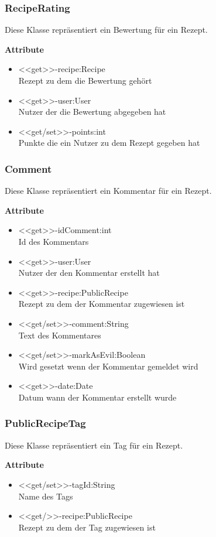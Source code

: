 \subsubsection{RecipeRating}
Diese Klasse repräsentiert ein Bewertung für ein Rezept.

\textbf{Attribute}
\begin{itemize}
	\item <<get>>-recipe:Recipe \\Rezept zu dem die Bewertung gehört
	\item <<get>>-user:User \\Nutzer der die Bewertung abgegeben hat
	\item <<get/set>>-points:int \\Punkte die ein Nutzer zu dem Rezept gegeben hat
\end{itemize}

\subsubsection{Comment}
Diese Klasse repräsentiert ein Kommentar für ein Rezept.

\textbf{Attribute}
\begin{itemize}
	\item <<get>>-idComment:int \\Id des Kommentars
	\item <<get>>-user:User \\Nutzer der den Kommentar erstellt hat
	\item <<get>>-recipe:PublicRecipe \\Rezept zu dem der Kommentar zugewiesen ist
	\item <<get/set>>-comment:String \\Text des Kommentares
	\item <<get/set>>-markAsEvil:Boolean \\Wird gesetzt wenn der Kommentar gemeldet wird
	\item <<get>>-date:Date \\Datum wann der Kommentar erstellt wurde
\end{itemize}

\subsubsection{PublicRecipeTag}
Diese Klasse repräsentiert ein Tag für ein Rezept.

\textbf{Attribute}
\begin{itemize}
	\item <<get/set>>-tagId:String \\Name des Tags
	\item <<get/>>-recipe:PublicRecipe \\Rezept zu dem der Tag zugewiesen ist
\end{itemize}

